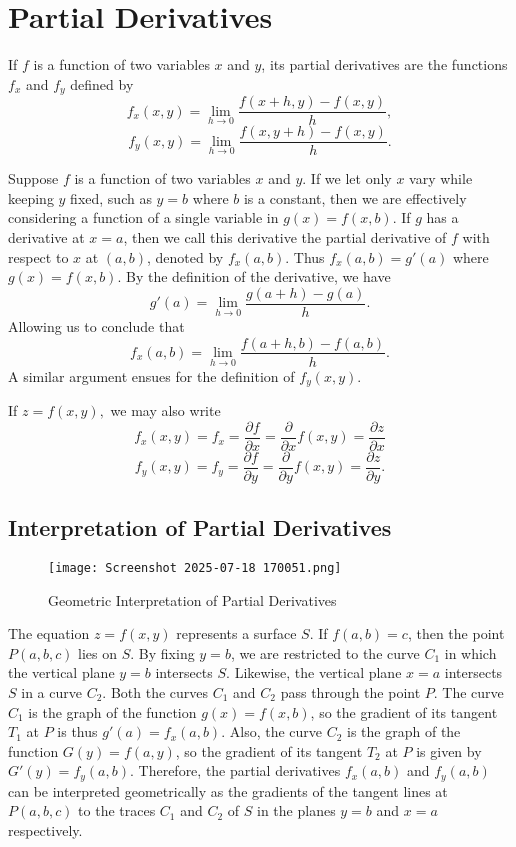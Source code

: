 \documentclass{article}
\begin{document}
\section{Partial Derivatives}
\begin{definition}
    If $f$ is a function of two variables $x$ and $y$, its partial derivatives are the functions $f_x$ and $f_y$ defined by
    $$f_x(x,y)=\lim_{h\to0}\frac{f(x+h,y)-f(x,y)}{h},$$
    $$f_y(x,y)=\lim_{h\to0}\frac{f(x,y+h)-f(x,y)}{h}.$$
\end{definition}
\begin{explanation}
    Suppose $f$ is a function of two variables $x$ and $y$. If we let only $x$ vary while keeping $y$ fixed, such as $y=b$ where $b$ is a constant, then we are effectively considering a function of a single variable in $g(x)=f(x,b)$. If $g$ has a derivative at $x=a$, then we call this derivative the partial derivative of $f$ with respect to $x$ at $(a,b)$, denoted by $f_x(a,b)$. Thus $f_x(a,b)=g'(a)$ where $g(x)=f(x,b)$. By the definition of the derivative, we have
    $$g'(a)=\lim_{h\to 0}\frac{g(a+h)-g(a)}{h}.$$
    Allowing us to conclude that
    $$f_x(a,b)=\lim_{h\to 0}\frac{f(a+h,b)-f(a,b)}{h}.$$
    A similar argument ensues for the definition of $f_y(x,y).$
\end{explanation}
\begin{notation}
    If $z=f(x,y),$ we may also write 
    $$f_x(x,y)=f_x=\frac{\partial f}{\partial x}=\frac{\partial}{\partial x}f(x,y)=\frac{\partial z}{\partial x}$$
     $$f_y(x,y)=f_y=\frac{\partial f}{\partial y}=\frac{\partial}{\partial y}f(x,y)=\frac{\partial z}{\partial y}.$$
\end{notation}
\subsection{Interpretation of Partial Derivatives}
\begin{figure}[h]
    \centering
    \texttt{[image: Screenshot 2025-07-18 170051.png]}
    \caption{Geometric Interpretation of Partial Derivatives}
\end{figure}

The equation $z=f(x,y)$ represents a surface $S$. If $f(a,b)=c$, then the point $P(a,b,c)$ lies on $S$. By fixing $y=b$, we are restricted to the curve $C_1$ in which the vertical plane $y=b$ intersects $S$. Likewise, the vertical plane $x=a$ intersects $S$ in a curve $C_2.$ Both the curves $C_1$ and $C_2$ pass through the point $P$. The curve $C_1$ is the graph of the function $g(x)=f(x,b)$, so the gradient of its tangent $T_1$ at $P$ is thus $g'(a)=f_x(a,b).$ Also, the curve $C_2$ is the graph of the function $G(y)=f(a,y)$, so the gradient of its tangent $T_2$ at $P$ is given by $G'(y)=f_y(a,b).$ Therefore, the partial derivatives $f_x(a,b)$ and $f_y(a,b)$ can be interpreted geometrically as the gradients of the tangent lines at $P(a,b,c)$ to the traces $C_1$ and $C_2$ of $S$ in the planes $y=b$ and $x=a$ respectively.
\end{document}
